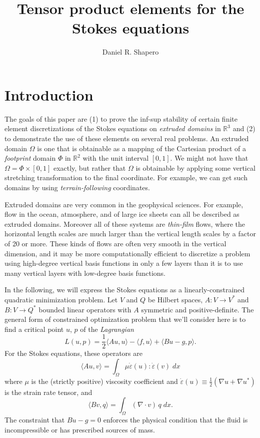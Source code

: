 \documentclass{article}
\title{Tensor product elements for the Stokes equations}
\author{Daniel R. Shapero}
\date{}
\theoremstyle{definition}
\theoremstyle{plain}
\begin{document}
\maketitle

\section{Introduction}

The goals of this paper are (1) to prove the inf-sup stability of certain finite element discretizations of the Stokes equations on \emph{extruded domains} in $\mathbb{R}^3$ and (2) to demonstrate the use of these elements on several real problems.
An extruded domain $\Omega$ is one that is obtainable as a mapping of the Cartesian product of a \emph{footprint} domain $\Phi$ in $\mathbb{R}^2$ with the unit interval $[0, 1]$.
We might not have that $\Omega = \Phi \times [0, 1]$ exactly, but rather that $\Omega$ is obtainable by applying some vertical stretching transformation to the final coordinate.
For example, we can get such domains by using \emph{terrain-following} coordinates.

Extruded domains are very common in the geophysical sciences.
For example, flow in the ocean, atmosphere, and of large ice sheets can all be described as extruded domains.
Moreover all of these systems are \emph{thin-film} flows, where the horizontal length scales are much larger than the vertical length scales by a factor of 20 or more.
These kinds of flows are often very smooth in the vertical dimension, and it may be more computationally efficient to discretize a problem using high-degree vertical basis functions in only a few layers than it is to use many vertical layers with low-degree basis functions.

In the following, we will express the Stokes equations as a linearly-constrained quadratic minimization problem.
Let $V$ and $Q$ be Hilbert spaces, $A : V \to V^*$ and $B : V \to Q^*$ bounded linear operators with $A$ symmetric and positive-definite.
The general form of constrained optimization problem that we'll consider here is to find a critical point $u$, $p$ of the \emph{Lagrangian}
\begin{equation}
    L(u, p) = \frac{1}{2}\langle Au, u\rangle - \langle f, u\rangle + \langle Bu - g, p\rangle.
\end{equation}
For the Stokes equations, these operators are
\begin{equation}
    \langle Au, v\rangle = \int_\Omega \mu\dot\varepsilon(u):\dot\varepsilon(v)\; dx
\end{equation}
where $\mu$ is the (strictly positive) viscosity coefficient and $\dot\varepsilon(u) \equiv \frac{1}{2}(\nabla u + \nabla u^*)$ is the strain rate tensor, and
\begin{equation}
    \langle Bv, q\rangle = \int_\Omega (\nabla\cdot v)\,q\;dx.
\end{equation}
The constraint that $Bu - g = 0$ enforces the physical condition that the fluid is incompressible or has prescribed sources of mass.
\end{document}
